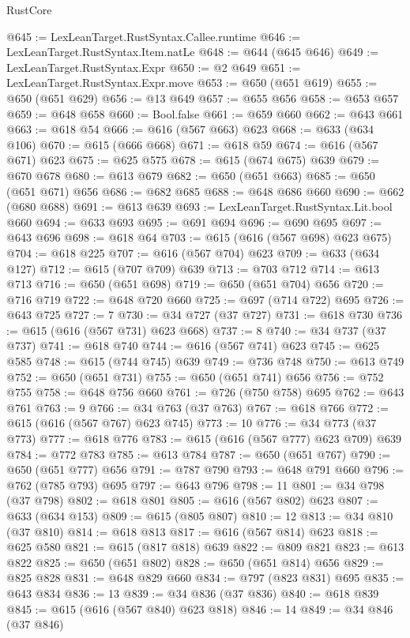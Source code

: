 \begin{lexlean}{RustCore}
\begin{coremodule}
@645 := LexLeanTarget.RustSyntax.Callee.runtime
@646 := LexLeanTarget.RustSyntax.Item.natLe
@648 := @644 (@645 @646)
@649 := LexLeanTarget.RustSyntax.Expr
@650 := @2 @649
@651 := LexLeanTarget.RustSyntax.Expr.move
@653 := @650 (@651 @619)
@655 := @650 (@651 @629)
@656 := @13 @649
@657 := @655 @656
@658 := @653 @657
@659 := @648 @658
@660 := Bool.false
@661 := @659 @660
@662 := @643 @661
@663 := @618 @54
@666 := @616 (@567 @663) @623
@668 := @633 (@634 @106)
@670 := @615 (@666 @668)
@671 := @618 @59
@674 := @616 (@567 @671) @623
@675 := @625 @575
@678 := @615 (@674 @675) @639
@679 := @670 @678
@680 := @613 @679
@682 := @650 (@651 @663)
@685 := @650 (@651 @671) @656
@686 := @682 @685
@688 := @648 @686 @660
@690 := @662 (@680 @688)
@691 := @613 @639
@693 := LexLeanTarget.RustSyntax.Lit.bool @660
@694 := @633 @693
@695 := @691 @694
@696 := @690 @695
@697 := @643 @696
@698 := @618 @64
@703 := @615 (@616 (@567 @698) @623 @675)
@704 := @618 @225
@707 := @616 (@567 @704) @623
@709 := @633 (@634 @127)
@712 := @615 (@707 @709) @639
@713 := @703 @712
@714 := @613 @713
@716 := @650 (@651 @698)
@719 := @650 (@651 @704) @656
@720 := @716 @719
@722 := @648 @720 @660
@725 := @697 (@714 @722) @695
@726 := @643 @725
@727 := 7
@730 := @34 @727 (@37 @727)
@731 := @618 @730
@736 := @615 (@616 (@567 @731) @623 @668)
@737 := 8
@740 := @34 @737 (@37 @737)
@741 := @618 @740
@744 := @616 (@567 @741) @623
@745 := @625 @585
@748 := @615 (@744 @745) @639
@749 := @736 @748
@750 := @613 @749
@752 := @650 (@651 @731)
@755 := @650 (@651 @741) @656
@756 := @752 @755
@758 := @648 @756 @660
@761 := @726 (@750 @758) @695
@762 := @643 @761
@763 := 9
@766 := @34 @763 (@37 @763)
@767 := @618 @766
@772 := @615 (@616 (@567 @767) @623 @745)
@773 := 10
@776 := @34 @773 (@37 @773)
@777 := @618 @776
@783 := @615 (@616 (@567 @777) @623 @709) @639
@784 := @772 @783
@785 := @613 @784
@787 := @650 (@651 @767)
@790 := @650 (@651 @777) @656
@791 := @787 @790
@793 := @648 @791 @660
@796 := @762 (@785 @793) @695
@797 := @643 @796
@798 := 11
@801 := @34 @798 (@37 @798)
@802 := @618 @801
@805 := @616 (@567 @802) @623
@807 := @633 (@634 @153)
@809 := @615 (@805 @807)
@810 := 12
@813 := @34 @810 (@37 @810)
@814 := @618 @813
@817 := @616 (@567 @814) @623
@818 := @625 @580
@821 := @615 (@817 @818) @639
@822 := @809 @821
@823 := @613 @822
@825 := @650 (@651 @802)
@828 := @650 (@651 @814) @656
@829 := @825 @828
@831 := @648 @829 @660
@834 := @797 (@823 @831) @695
@835 := @643 @834
@836 := 13
@839 := @34 @836 (@37 @836)
@840 := @618 @839
@845 := @615 (@616 (@567 @840) @623 @818)
@846 := 14
@849 := @34 @846 (@37 @846)

\end{coremodule}
\end{lexlean}
